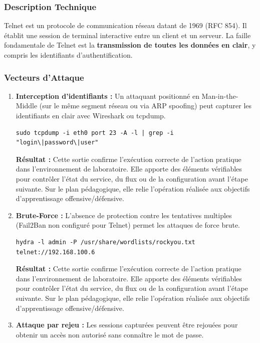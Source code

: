 \documentclass[12pt,a4paper,openany]{report}
\begin{document}
	\subsubsection{Description Technique}
	Telnet est un protocole de communication réseau datant de 1969 (RFC 854). Il établit une session de terminal interactive entre un client et un serveur. La faille fondamentale de Telnet est la \textbf{transmission de toutes les données en clair}, y compris les identifiants d'authentification.
	
	\subsubsection{Vecteurs d'Attaque}
	\begin{enumerate}
		\item \textbf{Interception d'identifiants :} Un attaquant positionné en Man-in-the-Middle (sur le même segment réseau ou via ARP spoofing) peut capturer les identifiants en clair avec Wireshark ou tcpdump.
		\begin{lstlisting}[caption=Capture des identifiants Telnet avec tcpdump]
			sudo tcpdump -i eth0 port 23 -A -l | grep -i "login\|password\|user"
		\end{lstlisting}
		
		\textbf{Résultat :} Cette sortie confirme l'exécution correcte de l'action pratique dans l'environnement de laboratoire. Elle apporte des éléments vérifiables pour contrôler l'état du service, du flux ou de la configuration avant l'étape suivante. Sur le plan pédagogique, elle relie l'opération réalisée aux objectifs d'apprentissage offensive/défensive.
		
		
		\item \textbf{Brute-Force :} L'absence de protection contre les tentatives multiples (Fail2Ban non configuré pour Telnet) permet les attaques de force brute.
		\begin{lstlisting}[caption=Brute-force Telnet avec Hydra]
			hydra -l admin -P /usr/share/wordlists/rockyou.txt telnet://192.168.100.6
		\end{lstlisting}
		
		\textbf{Résultat :} Cette sortie confirme l'exécution correcte de l'action pratique dans l'environnement de laboratoire. Elle apporte des éléments vérifiables pour contrôler l'état du service, du flux ou de la configuration avant l'étape suivante. Sur le plan pédagogique, elle relie l'opération réalisée aux objectifs d'apprentissage offensive/défensive.
		
		
		\item \textbf{Attaque par rejeu :} Les sessions capturées peuvent être rejouées pour obtenir un accès non autorisé sans connaître le mot de passe.
	\end{enumerate}
	
\end{document}

